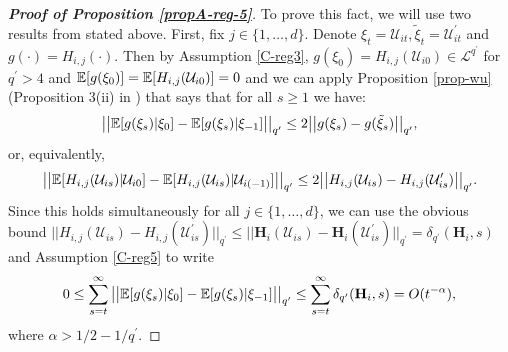 \documentclass[a4paper,12pt]{article}
\begin{document}
\begin{proof}[\textnormal{\textbf{Proof of Proposition \ref{propA-reg-5}}}] 


To prove this fact, we will use two results from \cite*{Wu2007} stated above. First, fix $j \in \{1, \ldots, d\}$. Denote $\xi_t = \mathcal{U}_{it}, \tilde{\xi}_t = \mathcal{U}^\prime_{it}$ and $g(\cdot) = H_{i,j}(\cdot)$. Then by Assumption \ref{C-reg3}, $g(\xi_0) = H_{i, j}(\mathcal{U}_{i0}) \in \mathcal{L}^{q^\prime}$ for $q^\prime > 4$ and $\mathbb{E}[g(\xi_0)] = \mathbb{E}[H_{i, j}(\mathcal{U}_{i0})] = 0$ and we can apply Proposition \ref{prop-wu} (Proposition 3(ii) in \cite{Wu2007}) that says that for all $s \geq 1$ we have:
\begin{align*}
\big|\big| \mathbb{E} [g(\xi_s)| \xi_0] - \mathbb{E} [g(\xi_s)| \xi_{-1}]\big|\big|_{q^\prime} \leq 2 \big|\big| g(\xi_s) - g(\tilde{\xi}_s)\big|\big|_{q^\prime},
\end{align*}
or, equivalently,
\begin{align*}
\big|\big| \mathbb{E} [H_{i, j}(\mathcal{U}_{is})| \mathcal{U}_{i0}] - \mathbb{E} [H_{i, j}(\mathcal{U}_{is})| \mathcal{U}_{i(-1)}]\big|\big|_{q^\prime} \leq 2 \big|\big| H_{i, j}(\mathcal{U}_{is}) - H_{i, j}(\mathcal{U}_{is}^\prime)\big|\big|_{q^\prime}.
\end{align*}
Since this holds simultaneously for all $j \in \{1, \ldots, d\}$, we can use the obvious bound $\big|\big| H_{i, j}(\mathcal{U}_{is}) - H_{i, j}(\mathcal{U}_{is}^\prime)\big|\big|_{q^\prime} \leq \big|\big| \mathbf{H}_{i}(\mathcal{U}_{is}) - \mathbf{H}_{i}(\mathcal{U}_{is}^\prime)\big|\big|_{q^\prime} = \delta_{q^\prime}(\mathbf{H}_i, s)$ and Assumption \ref{C-reg5} to write 
\begin{align*}
0 \leq \sum_{s = t}^\infty \big|\big| \mathbb{E} [g(\xi_s)| \xi_0] - \mathbb{E} [g(\xi_s)| \xi_{-1}]\big|\big|_{q^\prime} \leq \sum_{s = t}^\infty \delta_{q^\prime}(\mathbf{H}_i, s) =O(t^{-\alpha}),
\end{align*}
where $\alpha > 1/2 - 1/{q^\prime}$.


\end{proof}
\end{document}
